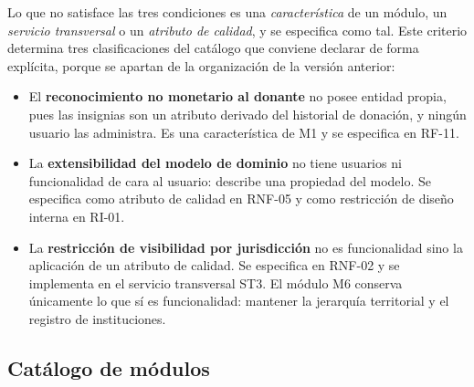 \documentclass[11pt,a4paper]{article}
\begin{document}
Lo que no satisface las tres condiciones es una \emph{característica} de un módulo, un \emph{servicio transversal} o un \emph{atributo de calidad}, y se especifica como tal. Este criterio determina tres clasificaciones del catálogo que conviene declarar de forma explícita, porque se apartan de la organización de la versión anterior:

\begin{itemize}
\item El \textbf{reconocimiento no monetario al donante} no posee entidad propia, pues las insignias son un atributo derivado del historial de donación, y ningún usuario las administra. Es una característica de M1 y se especifica en RF-11.
\item La \textbf{extensibilidad del modelo de dominio} no tiene usuarios ni funcionalidad de cara al usuario: describe una propiedad del modelo. Se especifica como atributo de calidad en RNF-05 y como restricción de diseño interna en RI-01.
\item La \textbf{restricción de visibilidad por jurisdicción} no es funcionalidad sino la aplicación de un atributo de calidad. Se especifica en RNF-02 y se implementa en el servicio transversal ST3. El módulo M6 conserva únicamente lo que sí es funcionalidad: mantener la jerarquía territorial y el registro de instituciones.
\end{itemize}

\subsection{Catálogo de módulos}
\end{document}

